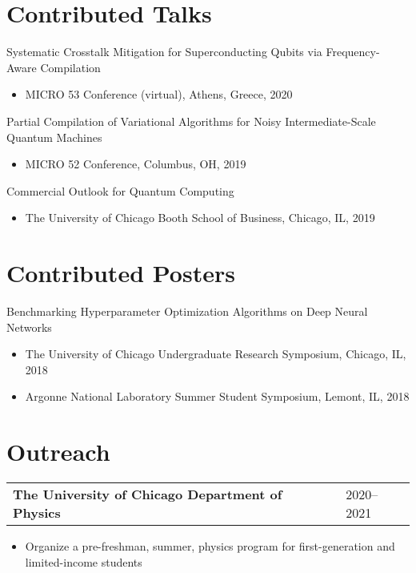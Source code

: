 \documentclass[letterpaper, 11pt]{article}
\begin{document}
\section{Contributed Talks}
Systematic Crosstalk Mitigation for Superconducting Qubits via Frequency-Aware Compilation\\
\begin{itemize}
  \item MICRO 53 Conference (virtual), Athens, Greece, 2020\\
\end{itemize}
Partial Compilation of Variational Algorithms for Noisy Intermediate-Scale Quantum Machines\\
\begin{itemize}
\item MICRO 52 Conference, Columbus, OH, 2019\\
\end{itemize}
Commercial Outlook for Quantum Computing\\
\begin{itemize}
\item The University of Chicago Booth School of Business, Chicago, IL, 2019\\
\end{itemize}

\section{Contributed Posters}
Benchmarking Hyperparameter Optimization Algorithms on Deep Neural Networks\\
\begin{itemize}
\item The University of Chicago Undergraduate Research Symposium, Chicago, IL, 2018\\
\item Argonne National Laboratory Summer Student Symposium, Lemont, IL, 2018\\
\end{itemize}

\section{Outreach}
\begin{tabular}{@{} L{12cm} @{} R{4.51cm} @{}}
  \textbf{The University of Chicago Department of Physics} & 2020--2021\\
\end{tabular}
\begin{itemize}
\item Organize a pre-freshman, summer, physics program for first-generation and limited-income
  students
\end{itemize}
\end{document}

